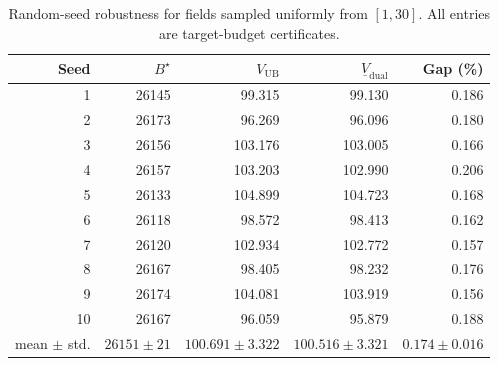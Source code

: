 \begin{table}[h]\centering\footnotesize\setlength{\tabcolsep}{5pt}
\caption{Random-seed robustness for fields sampled
uniformly from $[1,30]$. All entries are target-budget certificates.}
\label{tab:random-seeds-si}
\begin{tabular}{rrrrr}
\toprule
Seed & $B^\star$ & $V_{\mathrm{UB}}$ & $\underline V_{\mathrm{dual}}$ & Gap (\%)\\
\midrule
 1 & 26145 &  99.315 &  99.130 & 0.186\\
 2 & 26173 &  96.269 &  96.096 & 0.180\\
 3 & 26156 & 103.176 & 103.005 & 0.166\\
 4 & 26157 & 103.203 & 102.990 & 0.206\\
 5 & 26133 & 104.899 & 104.723 & 0.168\\
 6 & 26118 &  98.572 &  98.413 & 0.162\\
 7 & 26120 & 102.934 & 102.772 & 0.157\\
 8 & 26167 &  98.405 &  98.232 & 0.176\\
 9 & 26174 & 104.081 & 103.919 & 0.156\\
10 & 26167 &  96.059 &  95.879 & 0.188\\
\midrule
mean $\pm$ std. & $26151\pm21$ & $100.691\pm3.322$ &
$100.516\pm3.321$ & $0.174\pm0.016$\\
\bottomrule
\end{tabular}
\end{table}

